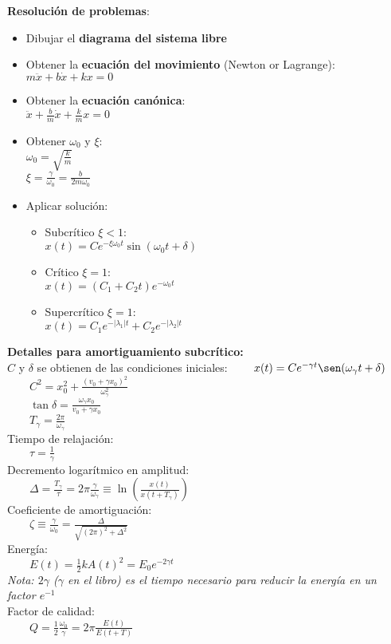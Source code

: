 \documentclass[a4paper,landscape,10pt]{cheatsheet}
\begin{document}
\textbf{Resolución de problemas}:
\begin{itemize}
  \item Dibujar el \textbf{diagrama del sistema libre}
  \item Obtener la \textbf{ecuación del movimiento} (Newton or Lagrange):\\
        $m\ddot{x}+b\dot{x}+kx=0$
  \item Obtener la \textbf{ecuación canónica}:\\
        $\ddot{x}+\frac{b}{m}\dot{x}+\frac{k}{m}x=0$
  \item Obtener $\omega_0$ y $\xi$:\\
        $\omega_0=\sqrt{\frac{k}{m}}$\\
        $\xi=\frac{\gamma}{\omega_0}=\frac{b}{2m\omega_0}$
  \item Aplicar solución:
        \begin{itemize}
          \item Subcrítico $\xi<1$:\\
                $x(t)=Ce^{-\xi \omega_0t}\sin\left(\omega_0t+\delta\right)$
          \item Crítico $\xi=1$:\\
                $x(t)=(C_1+C_2t)e^{-\omega_0t}$
          \item Supercrítico $\xi=1$:\\
                $x(t)=C_1e^{-\vert\lambda_1\vert t}+C_2e^{-\vert\lambda_2\vert t}$
        \end{itemize}
\end{itemize}


\textbf{Detalles para amortiguamiento subcrítico:}\\
$C$ y $\delta$ se obtienen de las condiciones iniciales:
$\qquad x(t)=Ce^{-\gamma t}\sen(\omega_\gamma t+\delta)$\\
$\qquad C^2=x_0^2+\frac{\left(v_0+\gamma x_0\right)^2}{\omega_\gamma^2}$\\
$\qquad \tan\delta=\frac{\omega_\gamma x_0}{v_0+\gamma x_0}$\\
$\qquad T_\gamma=\frac{2\pi}{\omega_\gamma}$\\
Tiempo de relajación:\\
$\qquad\tau=\frac{1}{\gamma}$\\
Decremento logarítmico en amplitud:\\
$\qquad\Delta=\frac{T_\gamma}{\tau}=2\pi\frac{\gamma}{\omega_\gamma}\equiv\ln{\left(\frac{x(t)}{x(t+T_\gamma)}\right)}$\\
Coeficiente de amortiguación: \\
$\qquad\zeta\equiv\frac{\gamma}{\omega_0}=\frac{\Delta}{\sqrt{(2\pi)^2+\Delta^2}} $\\
Energía:\\
$\qquad E(t)=\frac{1}{2}kA(t)^2=E_0e^{-2\gamma t}$\\
\textit{Nota: $2\gamma$ ($\gamma$ en el libro) es el tiempo necesario para reducir la energía en un factor $e^{-1}$}\\
Factor de calidad: \\
$\qquad Q=\frac{1}{2}\frac{\omega_0}{\gamma}=2\pi\frac{E(t)}{E(t+T)}$
\end{document}
